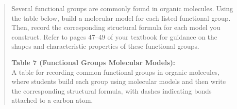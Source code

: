 \documentclass[
  letterpaper,
  DIV=11,
  numbers=noendperiod]{scrreprt}
\begin{document}
\begin{quote}
Several functional groups are commonly found in organic molecules. Using
the table below, build a molecular model for each listed functional
group. Then, record the corresponding structural formula for each model
you construct. Refer to pages 47--49 of your textbook for guidance on
the shapes and characteristic properties of these functional groups.

\textbf{\hfill\break
Table 7 (Functional Groups Molecular Models):}\\
A table for recording common functional groups in organic molecules,
where students build each group using molecular models and then write
the corresponding structural formula, with dashes indicating bonds
attached to a carbon atom.
\end{quote}
\end{document}
